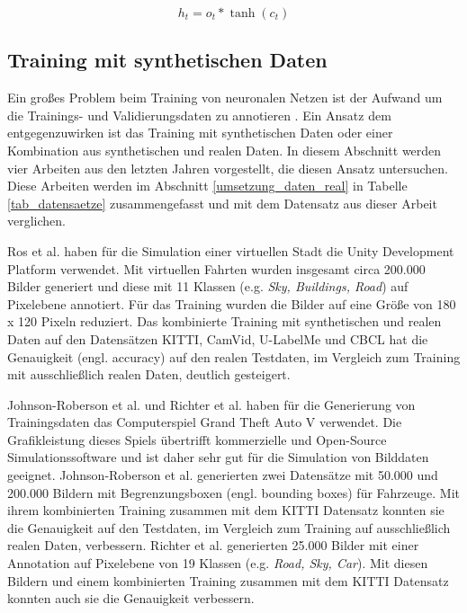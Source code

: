 \begin{equation}
h_t = o_t * \tanh(c_t)
\end{equation}


\subsection{Training mit synthetischen Daten}
\label{grundlagen_nn_synthetisch}

Ein großes Problem beim Training von neuronalen Netzen ist der Aufwand um die Trainings- und Validierungsdaten zu annotieren \cite{richter2016playing}. Ein Ansatz dem entgegenzuwirken ist das Training mit synthetischen Daten oder einer Kombination aus synthetischen und realen Daten. In diesem Abschnitt werden vier Arbeiten aus den letzten Jahren vorgestellt, die diesen Ansatz untersuchen. Diese Arbeiten werden im Abschnitt \ref{umsetzung_daten_real} in Tabelle \ref{tab_datensaetze} zusammengefasst und mit dem Datensatz aus dieser Arbeit verglichen.

Ros et al. \cite{ros2016synthia} haben für die Simulation einer virtuellen Stadt die Unity Development Platform verwendet. Mit virtuellen Fahrten wurden insgesamt circa 200.000 Bilder generiert und diese mit 11 Klassen (e.g. \textit{Sky, Buildings, Road}) auf Pixelebene annotiert. Für das Training wurden die Bilder auf eine Größe von 180 x 120 Pixeln reduziert. Das kombinierte Training mit synthetischen und realen Daten auf den Datensätzen KITTI, CamVid, U-LabelMe und CBCL hat die Genauigkeit (engl. accuracy) auf den realen Testdaten, im Vergleich zum Training mit ausschließlich realen Daten, deutlich gesteigert.

Johnson-Roberson et al. \cite{johnson2017driving} und Richter et al. \cite{richter2016playing} haben für die Generierung von Trainingsdaten das Computerspiel Grand Theft Auto V verwendet. Die Grafikleistung dieses Spiels übertrifft kommerzielle und Open-Source Simulationssoftware und ist daher sehr gut für die Simulation von Bilddaten geeignet. Johnson-Roberson et al. \cite{johnson2017driving} generierten zwei Datensätze mit 50.000 und 200.000 Bildern mit Begrenzungsboxen (engl. bounding boxes) für Fahrzeuge. Mit ihrem kombinierten Training zusammen mit dem KITTI Datensatz konnten sie die Genauigkeit auf den Testdaten, im Vergleich zum Training auf ausschließlich realen Daten, verbessern. Richter et al. \cite{richter2016playing} generierten 25.000 Bilder mit einer Annotation auf Pixelebene von 19 Klassen (e.g. \textit{Road, Sky, Car}). Mit diesen Bildern und einem kombinierten Training zusammen mit dem KITTI Datensatz konnten auch sie die Genauigkeit verbessern.

